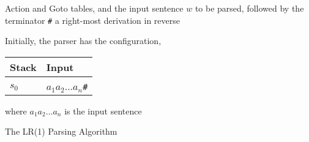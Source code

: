 \documentclass[8pt,a4paper,compress,handout]{beamer}
\begin{document}
\begin{frame}[fragile]
\pause

\begin{algorithm}[H]
\begin{algorithmic}
\REQUIRE Action and Goto tables, and the input sentence $w$ to be parsed, followed by the terminator \lstinline{#}
\ENSURE a right-most derivation in reverse

\STATE Initially, the parser has the configuration,

\begin{table}[H]
\begin{tabular}{ll}
Stack & Input \\ \hline \\
$s_0$ & $a_1 a_2 \dots a_n$\lstinline$#$
\end{tabular}
\end{table}

\bigskip

\noindent where $a_1 a_2 \dots a_n$ is the input sentence
\end{algorithmic}
\caption{The LR(1) Parsing Algorithm}
\end{algorithm}
\end{frame}
\end{document}
